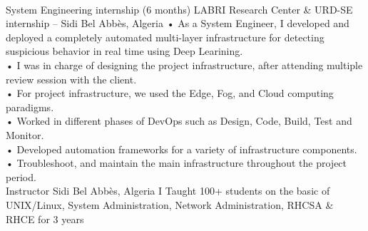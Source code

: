 \documentclass{cv}
\begin{document}
\\
    {System Engineering internship (6 months)
    }
    {LABRI Research Center  \& URD-SE internship -- Sidi Bel Abbès, Algeria\vspace{.3cm}}
    {
      • As a System Engineer, I developed and deployed a completely automated multi-layer infrastructure 
      for detecting suspicious behavior in real time using Deep Learining.\\
      • I was in charge of designing the project infrastructure, after attending multiple review session 
      with the client.\\
      • For project infrastructure, we used the Edge, Fog, and Cloud computing paradigms.\\
      • Worked in different phases of DevOps such as Design, Code, Build, Test and Monitor.\\
      • Developed automation frameworks for a variety of infrastructure components.\\
      • Troubleshoot, and maintain the main infrastructure throughout the project period.\\
    }
      {Instructor}
      { Sidi Bel Abbès, Algeria\vspace{.3cm}}
      {
      I Taught 100+ students on the basic of UNIX/Linux, System Administration, Network Administration, RHCSA \& RHCE for 3 years\\\\
      \\
      \\
      \\
      }
\end{document}
